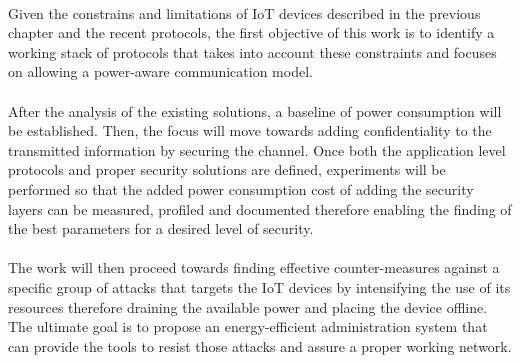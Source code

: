 \paragraph{}
Given the constrains and limitations of \ac{IoT} devices described in the previous chapter and the recent protocols, the first objective of this work is to identify a working stack of protocols that takes into account these constraints and focuses on allowing a power-aware communication model.

\paragraph{}
After the analysis of the existing solutions, a baseline of power consumption will be established. Then, the focus will move towards adding confidentiality to the transmitted information by securing the channel.
Once both the application level protocols and proper security solutions are defined, experiments will be performed so that the added power consumption cost of adding the security layers can be measured, profiled and documented therefore enabling the finding of the best parameters for a desired level of security.

\paragraph{}
The work will then proceed towards finding effective counter-measures against a specific group of attacks that targets the \ac{IoT} devices by intensifying the use of its resources therefore draining the available power and placing the device offline. The ultimate goal is to propose an energy-efficient administration system that can provide the tools to resist those attacks and assure a proper working network.